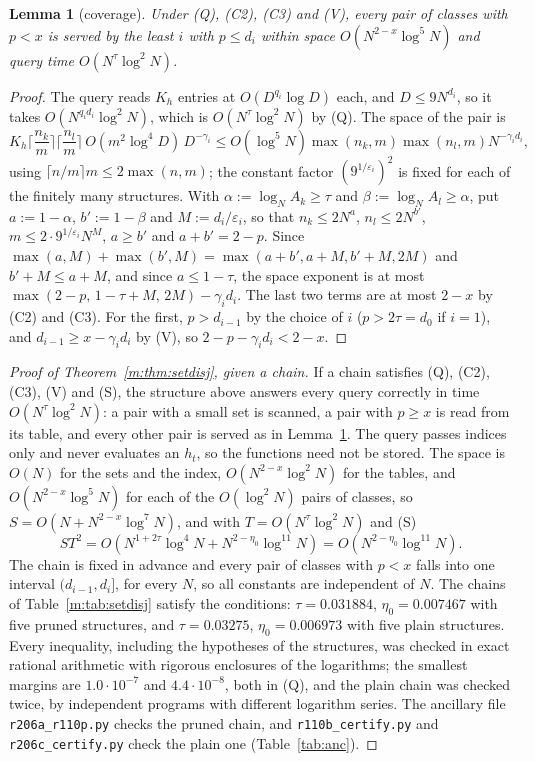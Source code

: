 \documentclass[11pt]{article}
\newtheorem{lemma}[theorem]{Lemma}
\theoremstyle{definition}
\theoremstyle{remark}
\newcommand{\SetDisjEta}{0.006973}%
\newcommand{\SetDisjEtaPruned}{0.007467}%
\newcommand{\SetDisjTauPruned}{0.031884}%
\newcommand{\SetDisjTau}{0.03275}%
\begin{document}
\begin{lemma}[coverage]\label{m:lem:setdisjcover}
Under (Q), (C2), (C3) and (V), every pair of classes with $p<x$ is served by the least $i$ with $p\le d_i$ within space $O(N^{2-x}\log^5N)$ and query time $O(N^\tau\log^2N)$.
\end{lemma}

\begin{proof}
The query reads $K_h$ entries at $O(D^{q_i}\log D)$ each, and $D\le9N^{d_i}$, so it takes $O(N^{q_id_i}\log^2N)$, which is $O(N^\tau\log^2N)$ by (Q). The space of the pair is
\[
K_h\Big\lceil\frac{n_k}m\Big\rceil\Big\lceil\frac{n_l}m\Big\rceil\,O(m^2\log^4\!D)\,D^{-\gamma_i}\le O(\log^5N)\max(n_k,m)\max(n_l,m)N^{-\gamma_id_i},
\]
using $\lceil n/m\rceil m\le2\max(n,m)$; the constant factor $(9^{1/\varepsilon_i})^2$ is fixed for each of the finitely many structures. With $\alpha:=\log_NA_k\ge\tau$ and $\beta:=\log_NA_l\ge\alpha$, put $a:=1-\alpha$, $b':=1-\beta$ and $M:=d_i/\varepsilon_i$, so that $n_k\le2N^a$, $n_l\le2N^{b'}$, $m\le2\cdot9^{1/\varepsilon_i}N^M$, $a\ge b'$ and $a+b'=2-p$. Since $\max(a,M)+\max(b',M)=\max(a+b',a+M,b'+M,2M)$ and $b'+M\le a+M$, and since $a\le1-\tau$, the space exponent is at most $\max(2-p,\,1-\tau+M,\,2M)-\gamma_id_i$. The last two terms are at most $2-x$ by (C2) and (C3). For the first, $p>d_{i-1}$ by the choice of $i$ ($p>2\tau=d_0$ if $i=1$), and $d_{i-1}\ge x-\gamma_id_i$ by (V), so $2-p-\gamma_id_i<2-x$.
\end{proof}

\begin{proof}[Proof of Theorem~\ref{m:thm:setdisj}, given a chain]
If a chain satisfies (Q), (C2), (C3), (V) and (S), the structure above answers every query correctly in time $O(N^\tau\log^2N)$: a pair with a small set is scanned, a pair with $p\ge x$ is read from its table, and every other pair is served as in Lemma~\ref{m:lem:setdisjcover}. The query passes indices only and never evaluates an $h_t$, so the functions need not be stored.
The space is $O(N)$ for the sets and the index, $O(N^{2-x}\log^2N)$ for the tables, and $O(N^{2-x}\log^5N)$ for each of the $O(\log^2N)$ pairs of classes, so $S=O(N+N^{2-x}\log^7N)$, and with $T=O(N^\tau\log^2N)$ and (S)
\[
ST^2=O(N^{1+2\tau}\log^4N+N^{2-\eta_0}\log^{11}N)=O(N^{2-\eta_0}\log^{11}N).
\]
The chain is fixed in advance and every pair of classes with $p<x$ falls into one interval $(d_{i-1},d_i]$, for every $N$, so all constants are independent of $N$. The chains of Table~\ref{m:tab:setdisj} satisfy the conditions: $\tau=\SetDisjTauPruned$, $\eta_0=\SetDisjEtaPruned$ with five pruned structures, and $\tau=\SetDisjTau$, $\eta_0=\SetDisjEta$ with five plain structures. Every inequality, including the hypotheses of the structures, was checked in exact rational arithmetic with rigorous enclosures of the logarithms; the smallest margins are $1.0\cdot10^{-7}$ and $4.4\cdot10^{-8}$, both in (Q), and the plain chain was checked twice, by independent programs with different logarithm series. The ancillary file \texttt{r206a\_r110p.py} checks the pruned chain, and \texttt{r110b\_certify.py} and \texttt{r206c\_certify.py} check the plain one (Table~\ref{tab:anc}).
\end{proof}
\end{document}
